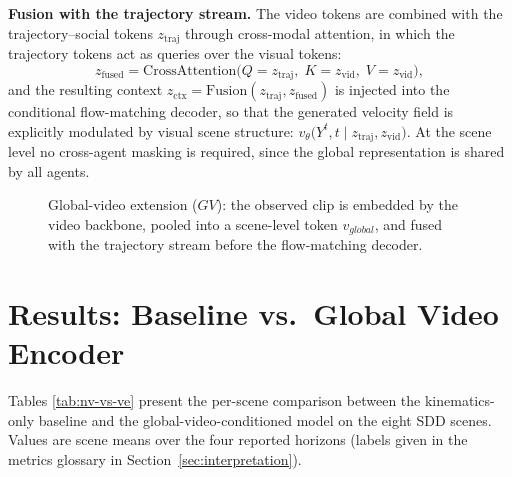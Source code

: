 \documentclass[11pt,a4paper]{article}
\begin{document}
\textbf{Fusion with the trajectory stream.} The video tokens are combined with
the trajectory--social tokens $z_{\mathrm{traj}}$ through cross-modal
attention, in which the trajectory tokens act as queries over the visual
tokens:
\begin{equation}
    z_{\mathrm{fused}} = \mathrm{CrossAttention}\big(
        Q = z_{\mathrm{traj}},\; K = z_{\mathrm{vid}},\; V = z_{\mathrm{vid}}\big),
\end{equation}
and the resulting context $z_{\mathrm{ctx}} = \mathrm{Fusion}(z_{\mathrm{traj}},
z_{\mathrm{fused}})$ is injected into the conditional flow-matching decoder, so
that the generated velocity field is explicitly modulated by visual scene
structure: $v_\theta\big(Y^t, t \mid z_{\mathrm{traj}}, z_{\mathrm{vid}}\big)$.
At the scene level no cross-agent masking is required, since the global
representation is shared by all agents.

\begin{figure}[htpb]
    \centering
    \resizebox{\textwidth}{!}{}
    \caption{Global-video extension ($GV$): the observed clip is embedded by the
    video backbone, pooled into a scene-level token $v_{global}$, and fused with
    the trajectory stream before the flow-matching decoder.
    \label{fig:arch-global}}
\end{figure}

\section{Results: Baseline vs.\ Global Video Encoder}
\label{sec:results-baseline-global}

Tables \ref{tab:nv-vs-ve} present the per-scene comparison between the
kinematics-only baseline and the global-video-conditioned model on the eight
SDD scenes. Values are scene means over the four reported horizons (labels
given in the metrics glossary in Section~\ref{sec:interpretation}).
\end{document}
